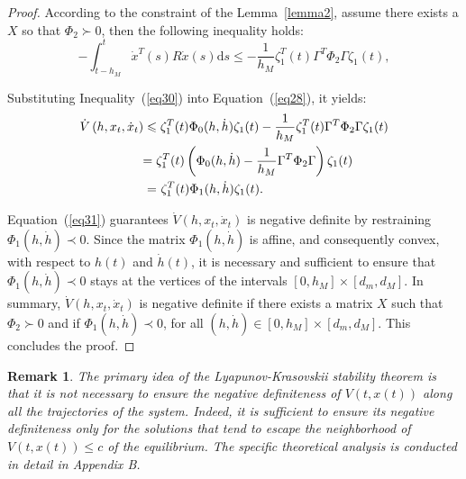 \documentclass[a4paper]{cas-sc}
\newtheorem*{proof}{Proof}
\newtheorem{remark}[theorem]{Remark}
\begin{document}
\begin{proof}
  According to the constraint of the Lemma~\ref{lemma2}, assume there exists a $X$ so that $ {\Phi _2} \succ 0 $, then the following inequality holds:
  \begin{equation}
    \label{eq30}
    - \int_{t - {h_M}}^t {{{\dot x}^T}} (s)R\dot x(s){\text{d}}s \leqslant  - \frac{1}{{{h_M}}}\zeta _1^T(t){\Gamma ^T}{\Phi _2}\Gamma {\zeta _1}(t),
  \end{equation}

  Substituting Inequality~(\ref{eq30}) into Equation~(\ref{eq28}), it yields:
  \begin{equation}
    \label{eq31}
    \begin{gathered}
      \dot V\left( {h,{x_t},{{\dot x}_t}} \right) \leqslant \zeta _1^T(t){\Phi _0}(h,\dot h){\zeta _1}(t) - \frac{1}{{{h_M}}}\zeta _1^T(t){\Gamma ^T}{\Phi _2}\Gamma {\zeta _1}(t) \hfill \\
      \quad \quad \quad \quad \quad  = \zeta _1^T(t)\left( {{\Phi _0}(h,\dot h) - \frac{1}{{{h_M}}}{\Gamma ^T}{\Phi _2}\Gamma } \right){\zeta _1}(t) \hfill \\
      \quad \quad \quad \quad \quad {\text{ = }}\zeta _1^T(t){\Phi _1}(h,\dot h){\zeta _1}(t). \hfill \\
    \end{gathered}
  \end{equation}

  Equation~(\ref{eq31}) guarantees $ \dot V\left( {h,{x_t},{{\dot x}_t}} \right) $ is negative definite by restraining $ {\Phi _1}(h,\dot h) \prec 0 $. Since the matrix $ {\Phi _1}(h,\dot h) $ is affine, and consequently convex, with respect to $ h(t) $ and $ \dot h(t) $, it is necessary and sufficient to ensure that $ {\Phi _1}(h,\dot h) \prec 0 $ stays at the vertices of the intervals $ \left[ {0,{h_M}} \right] \times \left[ {{d_m},{d_M}} \right] $. In summary, $ \dot V\left( {h,{x_t},{{\dot x}_t}} \right) $ is negative definite if there exists a matrix $X$ such that $ {\Phi _2} \succ 0 $ and if $ {\Phi _1}(h,\dot h) \prec 0 $, for all $ (h,\dot h) \in \left[ {0,{h_M}} \right] \times \left[ {{d_m},{d_M}} \right] $. This concludes the proof.

\end{proof}


\begin{remark}
  \label{remarkdiff}
  The primary idea of the Lyapunov-Krasovskii stability theorem is that it is not necessary to ensure the negative definiteness of $V\left(t,x\left(t\right)\right)$ along all the trajectories of the system. Indeed, it is sufficient to ensure its negative definiteness only for the solutions that tend to escape the neighborhood of $V\left(t,x\left(t\right)\right)\le c$ of the equilibrium. The specific theoretical analysis is conducted in detail in Appendix B.
\end{remark}
\end{document}
